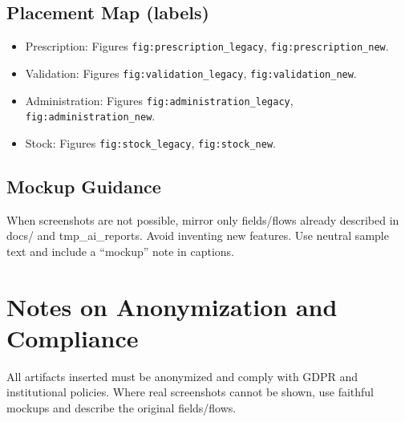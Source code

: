 \subsection*{Placement Map (labels)}
\begin{itemize}
    \item Prescription: Figures \texttt{fig:prescription\_legacy}, \texttt{fig:prescription\_new}.
    \item Validation: Figures \texttt{fig:validation\_legacy}, \texttt{fig:validation\_new}.
    \item Administration: Figures \texttt{fig:administration\_legacy}, \texttt{fig:administration\_new}.
    \item Stock: Figures \texttt{fig:stock\_legacy}, \texttt{fig:stock\_new}.
\end{itemize}

\subsection*{Mockup Guidance}
When screenshots are not possible, mirror only fields/flows already described in docs/ and tmp\_ai\_reports. Avoid inventing new features. Use neutral sample text and include a “mockup” note in captions.

\section{Notes on Anonymization and Compliance}
\begingroup\sloppy
All artifacts inserted must be anonymized and comply with GDPR and institutional policies. Where real screenshots cannot be shown, use faithful mockups and describe the original fields/flows.
\endgroup

